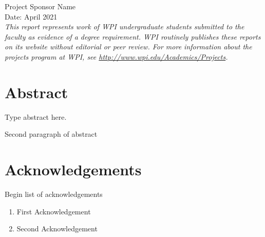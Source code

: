 \documentclass{article}
\begin{document}
\begin{center}
{    \vspace{5mm} %
    Project Sponsor Name \\ %
    \vspace {10mm} %
    Date: April 2021 \\ %
    }
    \vspace{10mm} %
    \large{\textit{This report represents work of WPI undergraduate students submitted to the faculty as evidence of a degree requirement. WPI routinely publishes these reports on its website without editorial or peer review. For more information about the projects program at WPI, see \url{http://www.wpi.edu/Academics/Projects}.}} %
\end{center}


\newpage %
\setcounter{page}{1} %

\section*{Abstract} %

\noindent Type abstract here. %
\par Second paragraph of abstract %

\newpage %
\section*{Acknowledgements} %

\noindent Begin list of acknowledgements
\begin{enumerate} %
    \item First Acknowledgement %
    \item Second Acknowledgement %
\end{enumerate}
\end{document}
